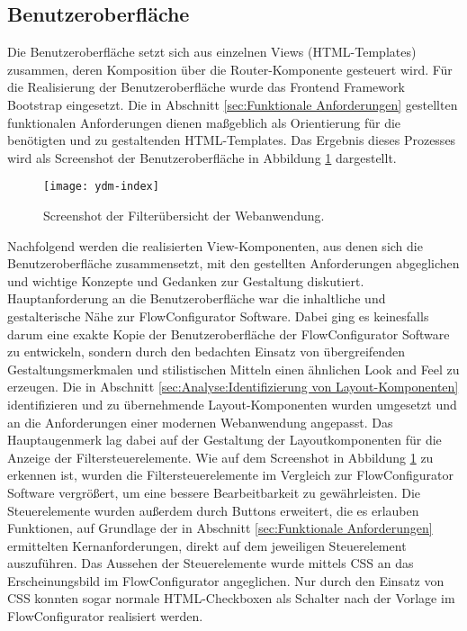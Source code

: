 \subsection{Benutzeroberfläche}
\label{sec:imp:Benutzeroberfläche}

Die Benutzeroberfläche setzt sich aus einzelnen Views (HTML-Templates) zusammen, deren Komposition über die Router-Komponente gesteuert wird. Für die Realisierung der Benutzeroberfläche wurde das Frontend Framework Bootstrap eingesetzt. Die in Abschnitt \ref{sec:Funktionale Anforderungen} gestellten funktionalen Anforderungen dienen maßgeblich als Orientierung für die benötigten und zu gestaltenden HTML-Templates. Das Ergebnis dieses Prozesses wird als Screenshot der Benutzeroberfläche in Abbildung \ref{fig:userinterface} dargestellt.
\begin{figure}[H]
\centering
\texttt{[image: ydm-index]} %
\caption{Screenshot der Filterübersicht der Webanwendung.}
\label{fig:userinterface}
\end{figure}
Nachfolgend werden die realisierten View-Komponenten, aus denen sich die Benutzeroberfläche zusammensetzt, mit den gestellten Anforderungen abgeglichen und wichtige Konzepte und Gedanken zur Gestaltung diskutiert. Hauptanforderung an die Benutzeroberfläche war die inhaltliche und gestalterische Nähe zur FlowConfigurator Software. Dabei ging es keinesfalls darum eine exakte Kopie der Benutzeroberfläche der FlowConfigurator Software zu entwickeln, sondern durch den bedachten Einsatz von übergreifenden Gestaltungsmerkmalen und stilistischen Mitteln einen ähnlichen \glqq{}Look and Feel\grqq{} zu erzeugen. Die in Abschnitt \ref{sec:Analyse:Identifizierung von Layout-Komponenten} identifizieren und zu übernehmende Layout-Komponenten wurden umgesetzt und an die Anforderungen einer modernen Webanwendung angepasst. Das Hauptaugenmerk lag dabei auf der Gestaltung der Layoutkomponenten für die Anzeige der Filtersteuerelemente. Wie auf dem Screenshot in Abbildung \ref{fig:userinterface} zu erkennen ist, wurden die Filtersteuerelemente im Vergleich zur FlowConfigurator Software vergrößert, um eine bessere Bearbeitbarkeit zu gewährleisten. Die Steuerelemente wurden außerdem durch Buttons erweitert, die es erlauben Funktionen, auf Grundlage der in Abschnitt \ref{sec:Funktionale Anforderungen} ermittelten Kernanforderungen, direkt auf dem jeweiligen Steuerelement auszuführen. Das Aussehen der Steuerelemente wurde mittels \ac{CSS} an das Erscheinungsbild im FlowConfigurator angeglichen. Nur durch den Einsatz von \ac{CSS} konnten sogar normale HTML-Checkboxen als Schalter nach der Vorlage im FlowConfigurator realisiert werden.

